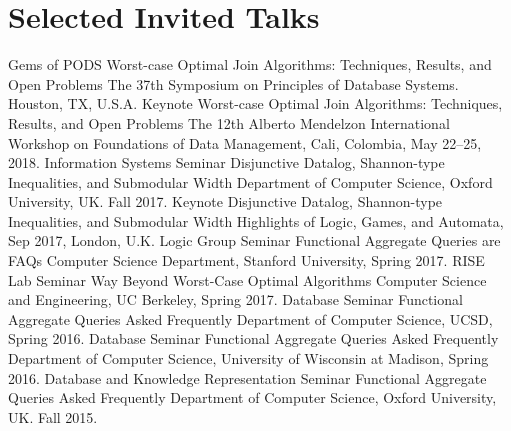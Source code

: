 \documentclass[10pt]{moderncv}
\begin{document}
\section{Selected Invited Talks}
{Gems of PODS}
{Worst-case Optimal Join Algorithms: Techniques, Results, and Open Problems}
{}{}
{The 37th Symposium on Principles of Database Systems.  Houston, TX, U.S.A.}
{Keynote}
{Worst-case Optimal Join Algorithms: Techniques, Results, and Open Problems}
{}{}
{The 12th Alberto Mendelzon International Workshop on Foundations of
Data Management, Cali, Colombia, May 22--25, 2018.}
{Information Systems Seminar}
{Disjunctive Datalog, Shannon-type Inequalities, and Submodular Width}
{}{}
{Department of Computer Science, Oxford University, UK. Fall 2017.}
{Keynote}
{Disjunctive Datalog, Shannon-type Inequalities, and Submodular Width}
{}{}
{Highlights of Logic, Games, and Automata, Sep 2017, London, U.K.}
{Logic Group Seminar}
{Functional Aggregate Queries are FAQs}
{}{}
{Computer Science Department, Stanford University, Spring 2017.}
{RISE Lab Seminar}
{Way Beyond Worst-Case Optimal Algorithms}
{}{}
{Computer Science and Engineering, UC Berkeley, Spring 2017.}
{Database Seminar}
{Functional Aggregate Queries Asked Frequently}
{}{}
{Department of Computer Science, UCSD, Spring 2016.}
{Database Seminar}
{Functional Aggregate Queries Asked Frequently}
{}{}
{Department of Computer Science, University of Wisconsin at Madison, Spring
2016.}
{Database and Knowledge Representation Seminar}
{Functional Aggregate Queries Asked Frequently}
{}{}
{Department of Computer Science, Oxford University, UK. Fall 2015.}
\end{document}
